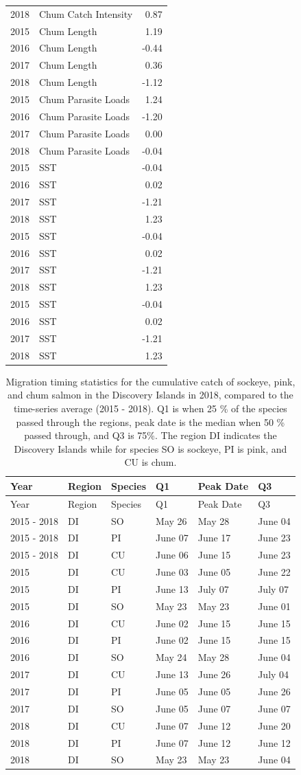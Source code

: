 \documentclass[fleqn,10pt]{wlpeerj} %
\begin{document}
\begin{longtable}[]{@{}rlr@{}}
2018 & Chum Catch Intensity & 0.87\tabularnewline
2015 & Chum Length & 1.19\tabularnewline
2016 & Chum Length & -0.44\tabularnewline
2017 & Chum Length & 0.36\tabularnewline
2018 & Chum Length & -1.12\tabularnewline
2015 & Chum Parasite Loads & 1.24\tabularnewline
2016 & Chum Parasite Loads & -1.20\tabularnewline
2017 & Chum Parasite Loads & 0.00\tabularnewline
2018 & Chum Parasite Loads & -0.04\tabularnewline
2015 & SST & -0.04\tabularnewline
2016 & SST & 0.02\tabularnewline
2017 & SST & -1.21\tabularnewline
2018 & SST & 1.23\tabularnewline
2015 & SST & -0.04\tabularnewline
2016 & SST & 0.02\tabularnewline
2017 & SST & -1.21\tabularnewline
2018 & SST & 1.23\tabularnewline
2015 & SST & -0.04\tabularnewline
2016 & SST & 0.02\tabularnewline
2017 & SST & -1.21\tabularnewline
2018 & SST & 1.23\tabularnewline
\bottomrule
\end{longtable}

\begin{longtable}[]{@{}llllll@{}}
\caption{\label{tab:migration-timing-table} Migration timing statistics for
the cumulative catch of sockeye, pink, and chum salmon in the Discovery
Islands in 2018, compared to the time-series average (2015 - 2018). Q1
is when 25 \% of the species passed through the regions, peak date is
the median when 50 \% passed through, and Q3 is 75\%. The region DI
indicates the Discovery Islands while for species SO is sockeye, PI is
pink, and CU is chum.}\tabularnewline
\toprule
Year & Region & Species & Q1 & Peak Date & Q3\tabularnewline
\midrule
\endfirsthead
\toprule
Year & Region & Species & Q1 & Peak Date & Q3\tabularnewline
\midrule
\endhead
2015 - 2018 & DI & SO & May 26 & May 28 & June 04\tabularnewline
2015 - 2018 & DI & PI & June 07 & June 17 & June 23\tabularnewline
2015 - 2018 & DI & CU & June 06 & June 15 & June 23\tabularnewline
2015 & DI & CU & June 03 & June 05 & June 22\tabularnewline
2015 & DI & PI & June 13 & July 07 & July 07\tabularnewline
2015 & DI & SO & May 23 & May 23 & June 01\tabularnewline
2016 & DI & CU & June 02 & June 15 & June 15\tabularnewline
2016 & DI & PI & June 02 & June 15 & June 15\tabularnewline
2016 & DI & SO & May 24 & May 28 & June 04\tabularnewline
2017 & DI & CU & June 13 & June 26 & July 04\tabularnewline
2017 & DI & PI & June 05 & June 05 & June 26\tabularnewline
2017 & DI & SO & June 05 & June 07 & June 07\tabularnewline
2018 & DI & CU & June 07 & June 12 & June 20\tabularnewline
2018 & DI & PI & June 07 & June 12 & June 12\tabularnewline
2018 & DI & SO & May 23 & May 23 & June 04\tabularnewline
\bottomrule
\end{longtable}
\end{document}
